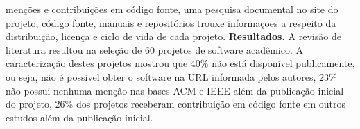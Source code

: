 menções e contribuições em código fonte, uma pesquisa documental no site do projeto,
código fonte, manuais e repositórios trouxe informaçoes a respeito da
distribuição, licença e ciclo de vida de cada projeto.
%
\textbf{Resultados.}
A revisão de literatura resultou na seleção de 60
projetos de software acadêmico. %
%
A caracterização destes projetos mostrou que 40\% não está disponível
publicamente, ou seja, não é possível obter o software na URL informada pelos
autores,
%
23\% não possui nenhuma menção nas bases
ACM e IEEE além da publicação inicial do projeto,
26\% dos projetos receberam contribuição em código fonte em outros estudos
além da publicação inicial.
%
%

